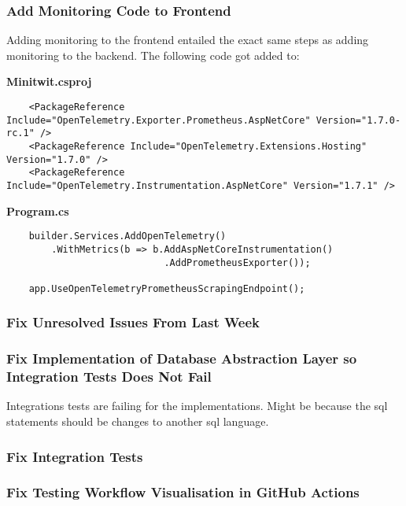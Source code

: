 \subsubsection{Add Monitoring Code to Frontend}
\label{log:add-monitoring-code-to-frontend}

Adding monitoring to the frontend entailed the exact same steps as
adding monitoring to the backend. The following code got added to:

\textbf{Minitwit.csproj}

\begin{verbatim}
    <PackageReference Include="OpenTelemetry.Exporter.Prometheus.AspNetCore" Version="1.7.0-rc.1" />
    <PackageReference Include="OpenTelemetry.Extensions.Hosting" Version="1.7.0" />
    <PackageReference Include="OpenTelemetry.Instrumentation.AspNetCore" Version="1.7.1" />
\end{verbatim}

\textbf{Program.cs}

\begin{verbatim}
    builder.Services.AddOpenTelemetry()
        .WithMetrics(b => b.AddAspNetCoreInstrumentation()
                            .AddPrometheusExporter());

    app.UseOpenTelemetryPrometheusScrapingEndpoint();
\end{verbatim}

\subsubsection{Fix Unresolved Issues From Last Week}
\label{log:fix-unresolved-issues-from-last-week}

\subsubsection{Fix Implementation of Database Abstraction Layer so Integration Tests Does Not Fail}
\label{log:fix-implementation-of-database-abstraction-layer-so-integration-tests-does-not-fail}

Integrations tests are failing for the implementations. Might be because
the sql statements should be changes to another sql language.

\subsubsection{Fix Integration Tests}
\label{log:fix-integrations-tests}

\subsubsection{Fix Testing Workflow Visualisation in GitHub Actions}
\label{log:fix-testing-workflow-visualisation-in-github-actions}

